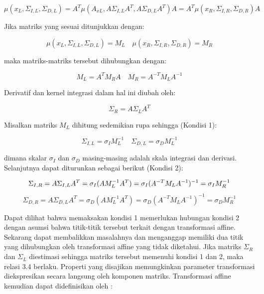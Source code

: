 \begin{equation}
  \mu(x_{L},\Sigma_{I,L},\Sigma_{D,L}) = A^{T}\mu(A_{xL},A\Sigma_{I,L}A^{T},A\Sigma_{D,L}A^{T})A = A^{T}\mu(x_{R},\Sigma_{I,R},\Sigma_{D,R})A
\end{equation}

Jika matriks yang sesuai ditunjukkan dengan:

\begin{equation*}
  \mu(x_{L},\Sigma_{I,L},\Sigma_{D,L}) = M_{L} \quad \mu(x_{R},\Sigma_{I,R},\Sigma_{D,R}) = M_{R}
\end{equation*}


maka matriks-matriks tersebut dihubungkan dengan:

\begin{equation}
  M_{L} = A^{T}M_{R}A \quad M_{R} = A^{-T}M_{L}A^{-1}
\end{equation}

Derivatif dan kernel integrasi dalam hal ini diubah oleh:

\begin{equation*}
  \Sigma_{R} = A\Sigma_{L}A^{T}
\end{equation*}

Misalkan matriks \(M_{L}\) dihitung sedemikian rupa sehingga (Kondisi 1):

\begin{equation}
  \Sigma_{I,L}=\sigma_{I}M_{L}^{-1} \quad \Sigma_{D,L}=\sigma_{D}M_{L}^{-1}
\end{equation}

dimana skalar \(\sigma_{I}\) dan \(\sigma_{D}\) masing-masing adalah skala integrasi dan derivasi. Selanjutnya dapat diturunkan sebagai berikut (Kondisi 2):

\begin{equation*}
  \Sigma_{I,R} = A\Sigma_{I,L}A^{T} = \sigma_{I}(AM_{L}^{-1}A^{T}) = \sigma_{I}(A^{-T}M_{L}A^{-1})^{-1} = \sigma_{I}M_{R}^{-1} \\
\end{equation*}
\begin{equation}
  \Sigma_{D,R} = A\Sigma_{D,L}A^{T} = \sigma_{D}(AM_{L}^{-1}A^{T}) = \sigma_{D}(A^{-T}M_{L}A^{-1})^{-1} = \sigma_{D}M_{R}^{-1}
\end{equation}


Dapat dilihat bahwa memaksakan kondisi 1 memerlukan hubungan kondisi 2 dengan asumsi bahwa titik-titik tersebut terkait dengan transformasi affine. Sekarang dapat membalikkan masalahnya dan menganggap memiliki dua titik yang dihubungkan oleh transformasi affine yang tidak diketahui. Jika matriks \(\Sigma_{R}\) dan \(\Sigma_{L}\) diestimasi sehingga matriks tersebut memenuhi kondisi 1 dan 2, maka relasi 3.4 berlaku. Properti yang disajikan memungkinkan parameter transformasi diekspresikan secara langsung oleh komponen matriks. Transformasi affine kemudian dapat didefinisikan oleh :

